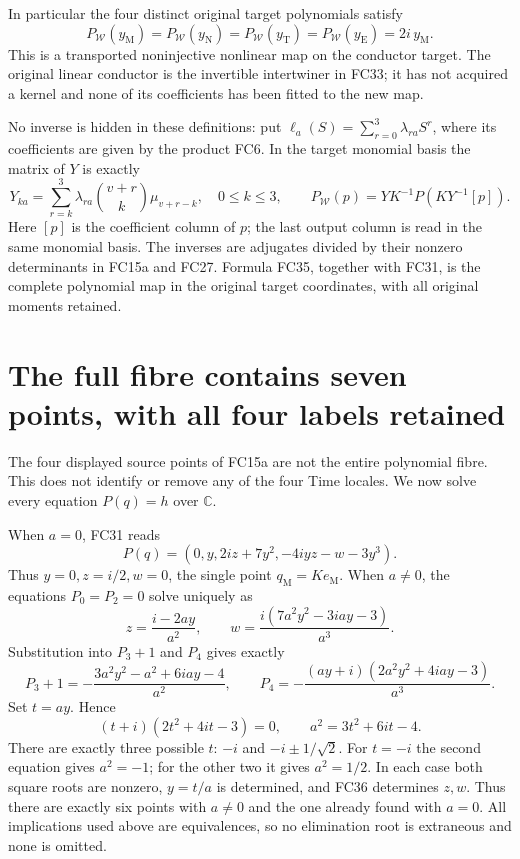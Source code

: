 \documentclass[11pt]{article}
\newcommand{\C}{\mathbb C}
\begin{document}
In particular the four distinct original target polynomials satisfy
\[
 P_{\mathcal W}(y_{\mathrm M})=
 P_{\mathcal W}(y_{\mathrm N})=
 P_{\mathcal W}(y_{\mathrm T})=
 P_{\mathcal W}(y_{\mathrm E})=2i\,y_{\mathrm M}.
 \tag{FC34}
\]
This is a transported noninjective nonlinear map on the conductor
target. The original linear conductor is the invertible intertwiner
in FC33; it has not acquired a kernel and none of its coefficients
has been fitted to the new map.

No inverse is hidden in these definitions: put
$\ell_a(S)=\sum_{r=0}^3\lambda_{ra}S^r$, where its coefficients are
given by the product FC6. In the target monomial basis the matrix of
$Y$ is exactly
\[
 Y_{ka}=\sum_{r=k}^3\lambda_{ra}\binom{v+r}{k}\mu_{v+r-k},
 \quad 0\le k\le3,\qquad
 P_{\mathcal W}(p)=YK^{-1}P(KY^{-1}[p]).
 \tag{FC35}
\]
Here $[p]$ is the coefficient column of $p$; the last output column is
read in the same monomial basis. The inverses are adjugates divided
by their nonzero determinants in FC15a and FC27. Formula FC35,
together with FC31, is the complete polynomial map in the original
target coordinates, with all original moments retained.

\section{The full fibre contains seven points, with all four labels retained}
The four displayed source points of FC15a are not the entire polynomial
fibre. This does not identify or remove any of the four Time locales.
We now solve every equation $P(q)=h$ over $\C$.

When $a=0$, FC31 reads
\[
 P(q)=(0,y,2iz+7y^2,-4iyz-w-3y^3).
\]
Thus $y=0,z=i/2,w=0$, the single point $q_{\mathrm M}=Ke_{\mathrm M}$.
When $a\ne0$, the equations $P_0=P_2=0$ solve uniquely as
\[
 z=\frac{i-2ay}{a^2},\qquad
 w=\frac{i(7a^2y^2-3iay-3)}{a^3}.
 \tag{FC36}
\]
Substitution into $P_3+1$ and $P_4$ gives exactly
\[
 P_3+1=-\frac{3a^2y^2-a^2+6iay-4}{a^2},\qquad
 P_4=-\frac{(ay+i)(2a^2y^2+4iay-3)}{a^3}.
 \tag{FC37}
\]
Set $t=ay$. Hence
\[
 (t+i)(2t^2+4it-3)=0,\qquad a^2=3t^2+6it-4.
 \tag{FC38}
\]
There are exactly three possible $t$: $-i$ and $-i\pm1/\sqrt2$.
For $t=-i$ the second equation gives $a^2=-1$; for the other two it
gives $a^2=1/2$. In each case both square roots are nonzero, $y=t/a$
is determined, and FC36 determines $z,w$. Thus there are exactly six
points with $a\ne0$ and the one already found with $a=0$.
All implications used above are equivalences, so no elimination root
is extraneous and none is omitted.
\end{document}
